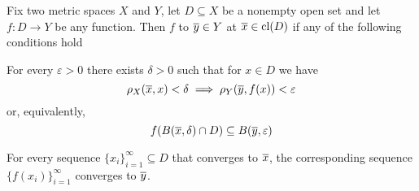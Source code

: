 \begin{proposition}\label{thm:metric_convergence_of_function_at_point}
  Fix two metric spaces \( X \) and \( Y \), let \( D \subseteq X \) be a nonempty open set and let \( f: D \to Y \) be any function. Then \( f \)  to \( \overline{y} \in Y \) at \( \overline{x} \in \operatorname{cl}(D) \) if any of the following conditions hold
  \begin{thmenum}
     For every \( \varepsilon > 0 \) there exists \( \delta > 0 \) such that for \( x \in D \) we have
    \begin{equation*}
      \rho_X(\overline{x}, x) < \delta \implies \rho_Y(\overline{y}, f(x)) < \varepsilon
    \end{equation*}
    or, equivalently,
    \begin{equation}\label{def:convergence_of_function_at_point/balls/inclusion}
      f(B(\overline{x}, \delta) \cap D) \subseteq B(\overline{y}, \varepsilon)
    \end{equation}

     For every sequence \( \{ x_i \}_{i=1}^\infty \subseteq D \) that converges to \( \overline{x} \), the corresponding sequence \( \{ f(x_i) \}_{i=1}^\infty \) converges to \( \overline{y} \).
  \end{thmenum}
\end{proposition}
